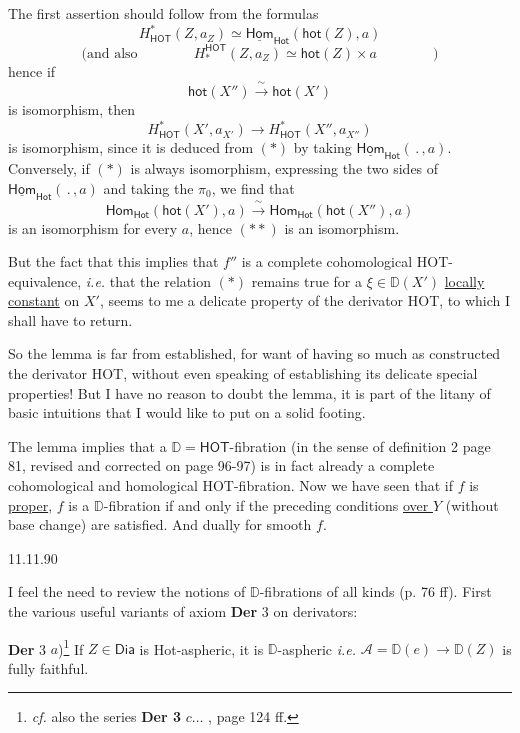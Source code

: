 \documentclass[11pt]{article}
\newcommand{\printedpage}[1]{\marginpar{\footnotesize p.~#1}}
\newcommand{\msp}[1]{\marginpar{\footnotesize [#1]}}
\newcommand{\HOT}{\textsf{HOT}}
\newcommand{\Hot}{\textsf{Hot}}
\newcommand{\DD}{\mathbb{D}}
\begin{document}
The first assertion should follow from the formulas
\[ H^{*}_{\mathsf{HOT}}(Z,a_Z) \simeq \underline{\mathsf{Hom}}_{\mathsf{Hot}}(\mathsf{hot}(Z),a) \tag*{$(*)$} \]
\[ \text{(and also} \qquad\qquad H_{*}^{\mathsf{HOT}}(Z,a_Z) \simeq \mathsf{hot}(Z) \times a \qquad\qquad ) \]
hence if
\[ \mathsf{hot}(X'') \xrightarrow{\ \sim\ } \mathsf{hot}(X') \tag*{$(**)$} \]
is isomorphism, then
\[ H^{*}_{\mathsf{HOT}}(X', a_{X'}) \longrightarrow H^{*}_{\mathsf{HOT}}(X'', a_{X''}) \]
is isomorphism, since it is deduced from $(*)$ by taking $\underline{\mathsf{Hom}}_{\mathsf{Hot}}(\,.\,,a)$. Conversely, if $(*)$ is always isomorphism, expressing the two sides of $\underline{\mathsf{Hom}}_{\mathsf{Hot}}(\,.\,,a)$ and taking the $\pi_0$, we find that
\[ \mathsf{Hom}_{\mathsf{Hot}}(\mathsf{hot}(X'),a) \xrightarrow{\ \sim\ } \mathsf{Hom}_{\mathsf{Hot}}(\mathsf{hot}(X''),a) \]
is an isomorphism for every $a$, hence $(**)$ is an isomorphism.

But the fact that this implies that $f''$ is a complete cohomological \HOT-equivalence, \textit{i.e.} that the relation $(*)$ remains true for a $\xi \in \DD(X')$ \underline{locally} \underline{constant} on $X'$, seems to me a delicate property of the derivator \HOT, to which I shall have to return.

So the lemma is far from established, for want of having so much as constructed the derivator \HOT, without even speaking of establishing its delicate special properties! But I have no reason to doubt the lemma, it is part of the litany of basic intuitions that I would like to put on a solid footing.

\printedpage{66}

\msp{page 111}

The lemma implies that a $\DD = \mathsf{HOT}$-fibration (in the sense of definition 2 page 81, revised and corrected on page 96-97) is in fact already a complete cohomological and homological \HOT-fibration. Now we have seen that if $f$ is \underline{proper}, $f$ is a $\DD$-fibration if and only if the preceding conditions \underline{over $Y$} (without base change) are satisfied. And dually for smooth $f$.

\begin{flushright}
11.11.90
\end{flushright}

I feel the need to review the notions of $\DD$-fibrations of all kinds (p. 76 ff). First the various useful variants of axiom \textbf{Der} 3 on derivators:

\textbf{Der} 3 $a$)\footnote[58]{\textit{cf.} also the series \textbf{Der 3} $c \ldots$ , page 124 ff.} If $Z \in \mathsf{Dia}$ is \Hot-aspheric, it is $\DD$-aspheric \textit{i.e.} $\mathcal{A} = \DD(e) \to \DD(Z)$ is fully faithful. %
\end{document}
